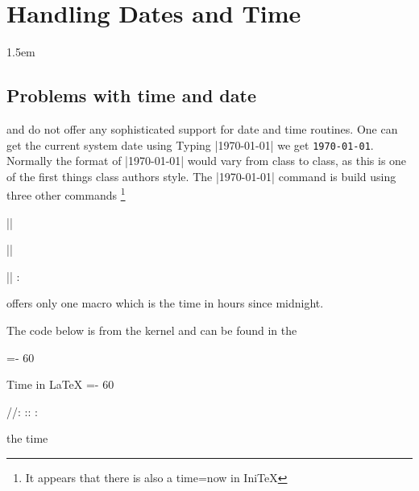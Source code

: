 \chapter{Handling Dates and Time}
\label{dates}\label{ch:dates}

\parindent1.5em

\section{Problems with time and date}

\tex and \latex do not offer\cite{Thanh:TB18-4-249} any sophisticated support for date and time routines.
One can get the current system date using 
Typing |\today| we get \texttt{\today}. Normally the format of |\today| would vary from class to class, as this is one of the first things class authors style. The |\today| command is build using three other commands \footnote{It appears that there is also a time=now in IniTeX}



\makeatletter
|\the\month| \the\month

|\the\day| \the\day

|\the\time| \two@digits{\the\count@}:
\makeatother

\tex offers only one macro  which is the time in hours since midnight.


The code below is from the \latex kernel and can be found in the 

\begin{teX}
\count@\time
\divide{}
=-\count@
\multiply{} 60
\advance{} \time

\edef\today{%
  \the\year/\two@digits{\the\month}/\two@digits{\the\day}:%
  \two@digits{\the\count@}:\two@digits{\the\count2}
 }
\end{teX}

\begin{texexample}{Time in LaTeX}{}
\makeatletter
\count@\time
\divide{}
=-\count@
\multiply{} 60
\advance{} \time

\edef\today{%
\the\year/\two@digits{\the\month}/\two@digits{\the\day}:%
\two@digits{\the\count@}:}


\today:   \the{}:  \the\count@

the time \the\time
\makeatother
\end{texexample}




